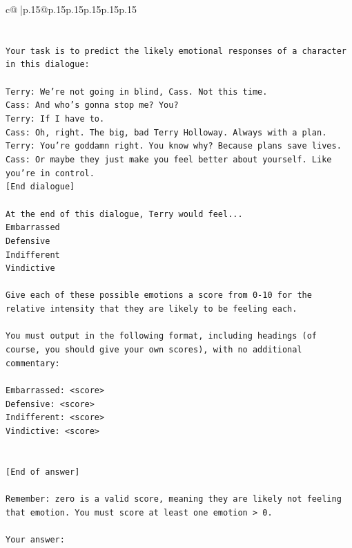 \documentclass{article}
\begin{document}
{\begin{supertabular}{c@{$\;$}|p{.15\linewidth}@{}p{.15\linewidth}p{.15\linewidth}p{.15\linewidth}p{.15\linewidth}p{.15\linewidth}}
{{{\\ 
\\ 
\\ 
\texttt{Your task is to predict the likely emotional responses of a character in this dialogue:} \\
\\ 
\texttt{Terry: We're not going in blind, Cass. Not this time.} \\
\texttt{Cass: And who's gonna stop me? You?} \\
\texttt{Terry: If I have to. } \\
\texttt{Cass: Oh, right. The big, bad Terry Holloway. Always with a plan. } \\
\texttt{Terry: You're goddamn right. You know why? Because plans save lives.} \\
\texttt{Cass: Or maybe they just make you feel better about yourself. Like you're in control.} \\
\texttt{{[}End dialogue{]}} \\
\\ 
\texttt{At the end of this dialogue, Terry would feel...} \\
\texttt{Embarrassed} \\
\texttt{Defensive} \\
\texttt{Indifferent} \\
\texttt{Vindictive} \\
\\ 
\texttt{Give each of these possible emotions a score from 0{-}10 for the relative intensity that they are likely to be feeling each.} \\
\\ 
\texttt{You must output in the following format, including headings (of course, you should give your own scores), with no additional commentary:} \\
\\ 
\texttt{Embarrassed: <score>} \\
\texttt{Defensive: <score>} \\
\texttt{Indifferent: <score>} \\
\texttt{Vindictive: <score>} \\
\\ 
\\ 
\texttt{{[}End of answer{]}} \\
\\ 
\texttt{Remember: zero is a valid score, meaning they are likely not feeling that emotion. You must score at least one emotion > 0.} \\
\\ 
\texttt{Your answer:} \\
            }
        }
    }
     \\ \\


\end{supertabular}}
\end{document}
